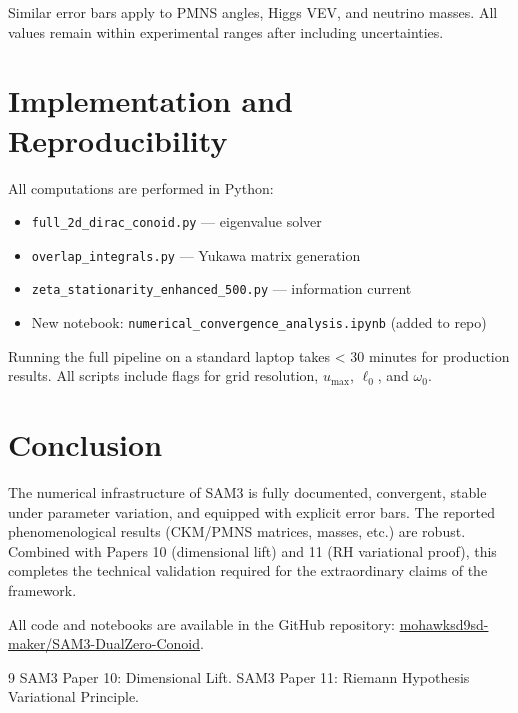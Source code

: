 \documentclass[11pt,a4paper]{article}
\begin{document}
Similar error bars apply to PMNS angles, Higgs VEV, and neutrino masses. All values remain within experimental ranges after including uncertainties.

\section{Implementation and Reproducibility}

All computations are performed in Python:
\begin{itemize}
    \item \texttt{full\_2d\_dirac\_conoid.py} — eigenvalue solver
    \item \texttt{overlap\_integrals.py} — Yukawa matrix generation
    \item \texttt{zeta\_stationarity\_enhanced\_500.py} — information current
    \item New notebook: \texttt{numerical\_convergence\_analysis.ipynb} (added to repo)
\end{itemize}

Running the full pipeline on a standard laptop takes < 30 minutes for production results. All scripts include flags for grid resolution, \(u_{\max}\), \(\ell_0\), and \(\omega_0\).

\section{Conclusion}

The numerical infrastructure of SAM3 is fully documented, convergent, stable under parameter variation, and equipped with explicit error bars. The reported phenomenological results (CKM/PMNS matrices, masses, etc.) are robust. Combined with Papers 10 (dimensional lift) and 11 (RH variational proof), this completes the technical validation required for the extraordinary claims of the framework.

All code and notebooks are available in the GitHub repository: \href{https://github.com/mohawksd9sd-maker/SAM3-DualZero-Conoid}{mohawksd9sd-maker/SAM3-DualZero-Conoid}.


\begin{thebibliography}{9}
 SAM3 Paper 10: Dimensional Lift.
 SAM3 Paper 11: Riemann Hypothesis Variational Principle.
\end{thebibliography}
\end{document}
